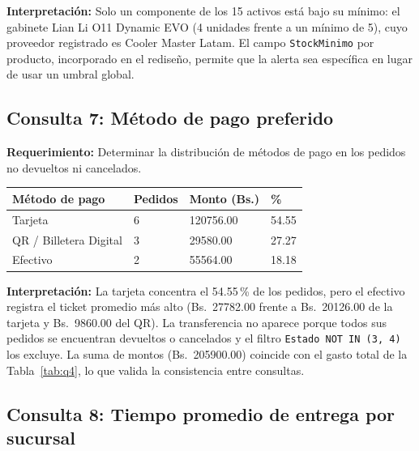 \textbf{Interpretación:} Solo un componente de los 15 activos está bajo su mínimo: el gabinete Lian Li O11 Dynamic EVO (4 unidades frente a un mínimo de 5), cuyo proveedor registrado es Cooler Master Latam.
El campo \texttt{StockMinimo} por producto, incorporado en el rediseño, permite que la alerta sea específica en lugar de usar un umbral global.

\subsection{Consulta 7: Método de pago preferido}

\textbf{Requerimiento:} Determinar la distribución de métodos de pago en los pedidos no devueltos ni cancelados.



\begin{center}
\label{tab:q7}
\begin{tablaAPA}
\begin{tabular}{L{4.4cm} R{2.0cm} R{3.0cm} R{2.0cm}}
\toprule
\textbf{Método de pago} & \textbf{Pedidos} & \textbf{Monto (Bs.)} & \textbf{\%} \\
\midrule
Tarjeta & 6 & 120756.00 & 54.55 \\
QR / Billetera Digital & 3 & 29580.00 & 27.27 \\
Efectivo & 2 & 55564.00 & 18.18 \\
\bottomrule
\end{tabular}
\end{tablaAPA}
\end{center}

\textbf{Interpretación:} La tarjeta concentra el 54.55\,\% de los pedidos, pero el efectivo registra el ticket promedio más alto (Bs.\ 27782.00 frente a Bs.\ 20126.00 de la tarjeta y Bs.\ 9860.00 del QR).
La transferencia no aparece porque todos sus pedidos se encuentran devueltos o cancelados y el filtro \texttt{Estado NOT IN (3, 4)} los excluye.
La suma de montos (Bs.\ 205900.00) coincide con el gasto total de la Tabla~\ref{tab:q4}, lo que valida la consistencia entre consultas.

\subsection{Consulta 8: Tiempo promedio de entrega por sucursal}

